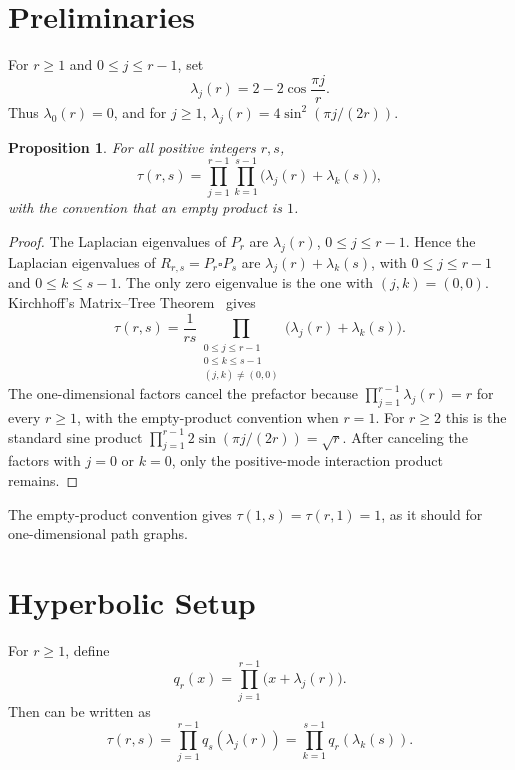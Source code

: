 \documentclass[11pt]{article}
\numberwithin{equation}{section}
\newtheorem{proposition}[proposition]{Proposition}
\begin{document}
\section{Preliminaries}\label{sec:preliminaries}

For $r\ge 1$ and $0\le j\le r-1$, set
\[
  \lambda_j(r)=2-2\cos\frac{\pi j}{r}.
\]
Thus $\lambda_0(r)=0$, and for $j\ge1$, $\lambda_j(r)=4\sin^2(\pi j/(2r))$.

\begin{proposition}\label{prop:product}
For all positive integers $r,s$,
\[
  \tau(r,s)
  =
  \prod_{j=1}^{r-1}\prod_{k=1}^{s-1}
  \bigl(\lambda_j(r)+\lambda_k(s)\bigr),
\]
with the convention that an empty product is $1$.
\end{proposition}

\begin{proof}
The Laplacian eigenvalues of $P_r$ are $\lambda_j(r)$, $0\le j\le r-1$. Hence the Laplacian eigenvalues of $R_{r,s}=P_r\square P_s$ are $\lambda_j(r)+\lambda_k(s)$, with $0\le j\le r-1$ and $0\le k\le s-1$.
The only zero eigenvalue is the one with $(j,k)=(0,0)$. Kirchhoff's Matrix--Tree Theorem~\cite{Kirchhoff1847} gives
\[
  \tau(r,s)
  =
  \frac{1}{rs}
  \prod_{\substack{0\le j\le r-1\\0\le k\le s-1\\(j,k)\ne(0,0)}}
  \bigl(\lambda_j(r)+\lambda_k(s)\bigr).
\]
The one-dimensional factors cancel the prefactor because $\prod_{j=1}^{r-1}\lambda_j(r)=r$ for every $r\ge1$, with the empty-product convention when $r=1$. For $r\ge2$ this is the standard sine product $\prod_{j=1}^{r-1}2\sin(\pi j/(2r))=\sqrt r$.
After canceling the factors with $j=0$ or $k=0$, only the positive-mode interaction product remains.
\end{proof}

The empty-product convention gives $\tau(1,s)=\tau(r,1)=1$, as it should for one-dimensional path graphs.

\section{Hyperbolic Setup}\label{sec:hyperbolic-setup}

For $r\ge1$, define
\[
  q_r(x)=\prod_{j=1}^{r-1}\bigl(x+\lambda_j(r)\bigr).
\]
Then  can be written as
\begin{equation}\label{eq:tau-q}
  \tau(r,s)
  =
  \prod_{j=1}^{r-1}q_s(\lambda_j(r))
  =
  \prod_{k=1}^{s-1}q_r(\lambda_k(s)).
\end{equation}
\end{document}
